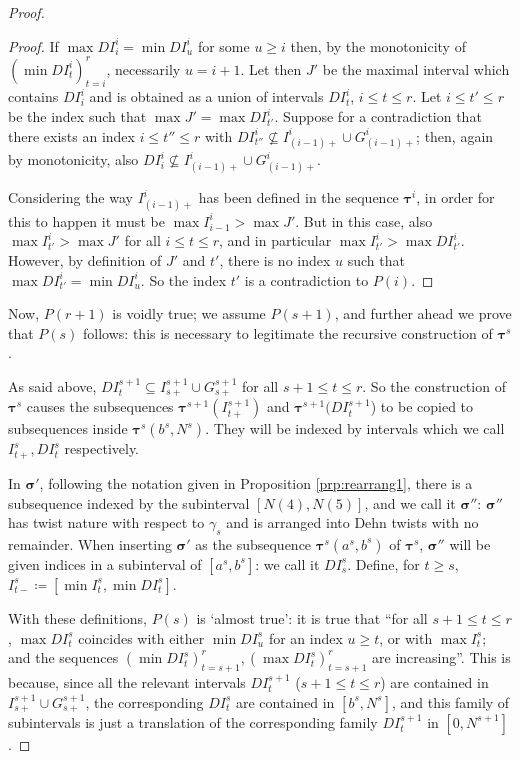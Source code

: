 \begin{proof}
\begin{proof}
If $\max DI^i_i=\min DI^i_u$ for some $u\geq i$ then, by the monotonicity of $(\min DI^{i}_t)_{t=i}^r$, necessarily $u=i+1$. Let then $J'$ be the maximal interval which contains $DI^i_i$ and is obtained as a union of intervals $DI^i_t$, $i\leq t\leq r$. Let $i\leq t'\leq r$ be the index such that $\max J'=\max DI^i_{t'}$. Suppose for a contradiction that there exists an index $i\leq t''\leq r$ with $DI^i_{t''}\not\subseteq I^i_{(i-1)+}\cup G^i_{(i-1)+}$; then, again by monotonicity, also $DI^i_i\not\subseteq I^i_{(i-1)+}\cup G^i_{(i-1)+}$.

Considering the way $I^i_{(i-1)+}$ has been defined in the sequence $\bm\tau^i$, in order for this to happen it must be $\max I^i_{i-1}>\max J'$. But in this case, also $\max I^i_{t'}>\max J'$ for all $i\leq t \leq r$, and in particular $\max I^i_{t'}>\max DI^i_{t'}$. However, by definition of $J'$ and $t'$, there is no index $u$ such that $\max DI^i_{t'}=\min DI^i_u$. So the index $t'$ is a contradiction to $P(i)$. 
\end{proof}

Now, $P(r+1)$ is voidly true; we assume $P(s+1)$, and further ahead we prove that $P(s)$ follows: this is necessary to legitimate the recursive construction of $\bm\tau^s$.

As said above, $DI^{s+1}_t\subseteq I^{s+1}_{s+}\cup G^{s+1}_{s+}$ for all $s+1\leq t\leq r$. So the construction of $\bm\tau^s$ causes the subsequences $\bm\tau^{s+1}(I^{s+1}_{t+})$ and $\bm\tau^{s+1}(DI^{s+1}_t$) to be copied to subsequences inside $\bm\tau^s\left(b^s,N^s\right)$. They will be indexed by intervals which we call $I^s_{t+}, DI^s_t$ respectively.

In $\bm\sigma'$, following the notation given in Proposition \ref{prp:rearrang1}, there is a subsequence indexed by the subinterval $[N(4), N(5)]$, and we call it $\bm\sigma''$: $\bm\sigma''$ has twist nature with respect to $\gamma_s$ and is arranged into Dehn twists with no remainder. When inserting $\bm\sigma'$ as the subsequence $\bm\tau^s(a^s,b^s)$ of $\bm\tau^s$, $\bm\sigma''$ will be given indices in a subinterval of $[a^s,b^s]$: we call it $DI^s_s$. Define, for $t\geq s$, $I^s_{t-}\coloneqq [\min I^s_t,\min DI^s_t]$.

With these definitions, $P(s)$ is `almost true': it is true that ``for all $s+1 \leq t \leq r$, $\max DI^s_t$ coincides with either $\min DI^s_{u}$ for an index $u\geq t$, or with $\max I^s_t$; and the sequences $(\min DI^s_t)_{t=s+1}^r, (\max DI^s_t)_{t=s+1}^r$ are increasing''. This is because, since all the relevant intervals $DI^{s+1}_t$ ($s+1 \leq t \leq r$) are contained in $I^{s+1}_{s+}\cup G^{s+1}_{s+}$, the corresponding $DI^s_t$ are contained in $[b^s,N^s]$, and this family of subintervals is just a translation of the corresponding family $DI^{s+1}_t$ in $[0,N^{s+1}]$.


\end{proof}
